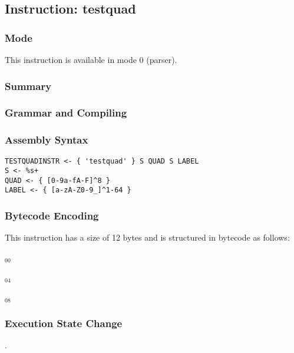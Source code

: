 \subsection{Instruction: testquad}

\subsubsection{Mode}
This instruction is available in mode 0 (parser).
\subsubsection{Summary}


\subsubsection{Grammar and Compiling}


\subsubsection{Assembly Syntax}

\begin{myquote}
\begin{verbatim}
TESTQUADINSTR <- { 'testquad' } S QUAD S LABEL
S <- %s+
QUAD <- { [0-9a-fA-F]^8 }
LABEL <- { [a-zA-Z0-9_]^1-64 }
\end{verbatim}
\end{myquote}

\subsubsection{Bytecode Encoding}

This instruction has a size of 12 bytes and is structured in bytecode as follows:

$_{00}$\ 



$_{04}$\ 



$_{08}$\ 
\fbox{%
  \parbox{20pt}{%
00
  }%
}

\subsubsection{Execution State Change}

.



